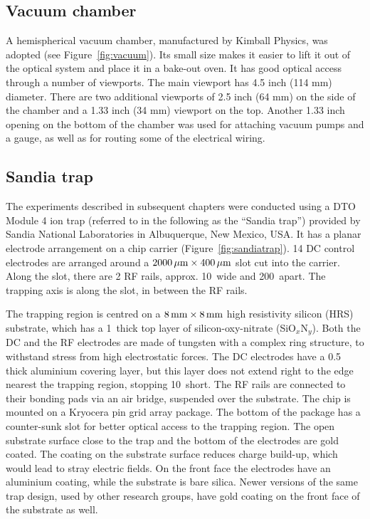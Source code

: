 \subsection{Vacuum chamber}

A hemispherical vacuum chamber, manufactured by Kimball Physics, was adopted (see Figure~\ref{fig:vacuum}). Its small size makes it easier to lift it out of the optical system and place it in a bake-out oven. It has good optical access through a number of viewports. The main viewport has 4.5 inch (114 mm) diameter. There are two additional viewports of 2.5 inch (64 mm) on the side of the chamber and a 1.33 inch (34 mm) viewport on the top. Another 1.33 inch opening on the bottom of the chamber was used for attaching vacuum pumps and a gauge, as well as for routing some of the electrical wiring.

\subsection{Sandia trap}
\label{subsec:sandiatrap}

The experiments described in subsequent chapters were conducted using a DTO Module 4 ion trap (referred to in the following as the ``Sandia trap'') provided by Sandia National Laboratories in Albuquerque, New Mexico, USA. It has a planar electrode arrangement on a chip carrier (Figure~\ref{fig:sandiatrap}). 14 DC control electrodes are arranged around a $ 2000\,\mbox{$\mu$m} \times 400\,\mbox{$\mu$m}$ slot cut into the carrier. Along the slot, there are 2 RF rails, approx. 10\um\, wide and 200\um\, apart. The trapping axis is along the slot, in between the RF rails.

The trapping region is centred on a $8\,\mbox{mm} \times 8\,\mbox{mm}$ high resistivity silicon (HRS) substrate, which has a 1\um\, thick top layer of silicon-oxy-nitrate (SiO$_x$N$_y$). Both the DC and the RF electrodes are made of tungsten  with a complex ring structure, to withstand stress from high electrostatic forces. The DC electrodes have a 0.5\um\, thick aluminium covering layer, but this layer does not extend right to the edge nearest the trapping region, stopping 10\um\, short. The RF rails are connected to their bonding pads via an air bridge, suspended over the substrate. The chip is mounted on a Kryocera pin grid array package. The bottom of the package has a counter-sunk slot for better optical access to the trapping region. The open substrate surface close to the trap and the bottom of the electrodes are gold coated. The coating on the substrate surface reduces charge build-up, which would lead to stray electric fields. On the front face the electrodes have an aluminium coating, while the substrate is bare silica. Newer versions of the same trap design, used by other research groups, have gold coating on the front face of the substrate as well.

